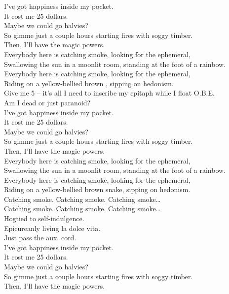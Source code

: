 I've got happiness inside my pocket. \\
It cost me 25 dollars. \\
Maybe we could go halvies? \\
So gimme just a couple hours starting fires with soggy timber. \\
Then, I'll have the magic powers. \\

Everybody here is catching smoke, looking for the ephemeral, \\
Swallowing the sun in a moonlit room, standing at the foot of a rainbow. \\
Everybody here is catching smoke, looking for the ephemeral, \\
Riding on a yellow-bellied brown , sipping on hedonism. \\

Give me 5 -- it's all I need to inscribe my epitaph while I float O.B.E. \\
Am I dead or just paranoid? \\

I've got happiness inside my pocket. \\
It cost me 25 dollars. \\
Maybe we could go halvies? \\
So gimme just a couple hours starting fires with soggy timber. \\
Then, I'll have the magic powers. \\

Everybody here is catching smoke, looking for the ephemeral, \\
Swallowing the sun in a moonlit room, standing at the foot of a rainbow. \\
Everybody here is catching smoke, looking for the ephemeral, \\
Riding on a yellow-bellied brown snake, sipping on hedonism. \\

Catching smoke. Catching smoke. Catching smoke… \\
Catching smoke. Catching smoke. Catching smoke… \\

Hogtied to self-indulgence. \\
Epicureanly living la dolce vita. \\
Just pass the aux. cord. \\

I've got happiness inside my pocket. \\
It cost me 25 dollars. \\
Maybe we could go halvies? \\
So gimme just a couple hours starting fires with soggy timber. \\
Then, I'll have the magic powers. \\

